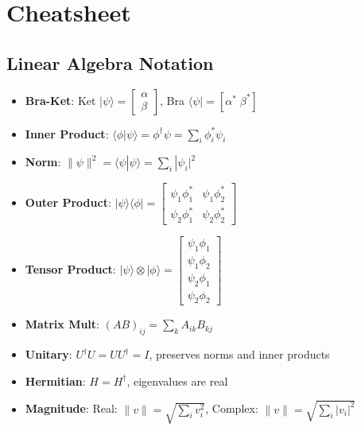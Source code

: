 \section{Cheatsheet}\label{sec:cheatsheet}

\begingroup
  \setlength{\parindent}{0pt}
  \setlength{\parskip}{0pt plus 0.5ex}
  \raggedright
  \footnotesize

  \makeatother

  \begin{multicols}{3}
    \section*{Linear Algebra Notation}
    \begin{itemize}[leftmargin=*,nosep,topsep=0pt]
      \item \textbf{Bra-Ket}: Ket $|\psi\rangle = \begin{bmatrix} \alpha \\ \beta \end{bmatrix}$, Bra $\langle\psi| = [\alpha^* \; \beta^*]$
      \item \textbf{Inner Product}: $\langle\phi|\psi\rangle = \phi^\dagger\psi = \sum_i \phi_i^*\psi_i$
      \item \textbf{Norm}: $\|\psi\|^2 = \langle\psi|\psi\rangle = \sum_i |\psi_i|^2$
      \item \textbf{Outer Product}: $|\psi\rangle\langle\phi| = \begin{bmatrix} \psi_1\phi_1^* & \psi_1\phi_2^* \\ \psi_2\phi_1^* & \psi_2\phi_2^* \end{bmatrix}$
      \item \textbf{Tensor Product}: $|\psi\rangle \otimes |\phi\rangle = \begin{bmatrix} \psi_1\phi_1 \\ \psi_1\phi_2 \\ \psi_2\phi_1 \\ \psi_2\phi_2 \end{bmatrix}$
      \item \textbf{Matrix Mult}: $(AB)_{ij} = \sum_k A_{ik}B_{kj}$
      \item \textbf{Unitary}: $U^\dagger U = UU^\dagger = I$, preserves norms
        and inner products
      \item \textbf{Hermitian}: $H = H^\dagger$, eigenvalues are real
      \item \textbf{Magnitude}: Real: $\|v\| = \sqrt{\sum_i v_i^2}$, Complex:
        $\|v\| = \sqrt{\sum_i |v_i|^2}$
    \end{itemize}


\end{multicols}
